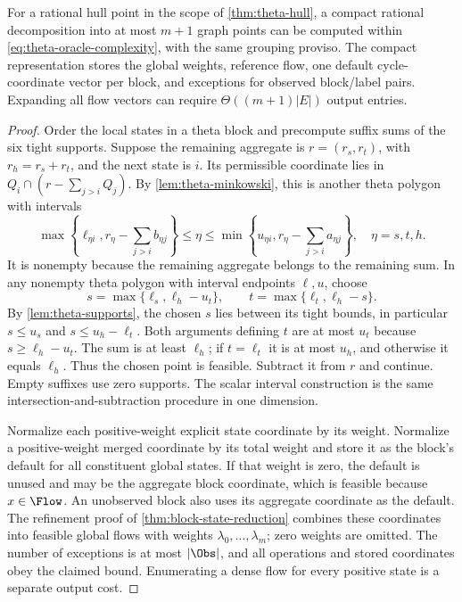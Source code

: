 \begin{proposition}\label{prop:theta-recovery}
For a rational hull point in the scope of \cref{thm:theta-hull}, a compact
rational decomposition into at most $m+1$ graph points can be computed
within \eqref{eq:theta-oracle-complexity}, with the same grouping proviso.
The compact representation stores the global weights, reference flow,
one default cycle-coordinate vector per block, and exceptions for observed block/label
pairs. Expanding all flow vectors can require $\Theta((m+1)|E|)$ output
entries.
\end{proposition}
\begin{proof}
Order the local states in a theta block and precompute suffix sums of
the six tight supports. Suppose the remaining aggregate is $r=(r_s,r_t)$,
with $r_h=r_s+r_t$, and the next state is $i$. Its permissible coordinate
lies in $Q_i\cap(r-\sum_{j>i}Q_j)$. By
\cref{lem:theta-minkowski}, this is another theta polygon with intervals
\begin{equation}\label{eq:theta-recovery-intersection}
 \max\left\{\ell_{\eta i},r_\eta-\sum_{j>i}b_{\eta j}\right\}
 \le\eta\le
 \min\left\{u_{\eta i},r_\eta-\sum_{j>i}a_{\eta j}\right\},
 \quad\eta=s,t,h.
\end{equation}
It is nonempty because the remaining aggregate belongs to the remaining
sum. In any nonempty theta polygon with interval endpoints $\ell,u$,
choose
\begin{equation}\label{eq:theta-point-choice}
 s=\max\{\ell_s,\ell_h-u_t\},\qquad
 t=\max\{\ell_t,\ell_h-s\}.
\end{equation}
By \cref{lem:theta-supports}, the chosen $s$ lies between its tight
bounds, in particular $s\le u_s$ and $s\le u_h-\ell_t$. Both
arguments defining $t$ are at most $u_t$ because
$s\ge\ell_h-u_t$. The sum is at least $\ell_h$; if $t=\ell_t$ it
is at most $u_h$, and otherwise it equals $\ell_h$. Thus the chosen
point is feasible. Subtract it from $r$ and continue. Empty suffixes
use zero supports. The scalar interval construction is the same
intersection-and-subtraction procedure in one dimension.

Normalize each positive-weight explicit state coordinate by its weight.
Normalize a positive-weight merged coordinate by its total weight and
store it as the block's default for all constituent global states.
If that weight is zero, the default is unused and may be the aggregate
block coordinate, which is feasible because $x\in\Flow$. An unobserved
block also uses its aggregate coordinate as the default. The refinement
proof of \cref{thm:block-state-reduction} combines these coordinates into
feasible global flows with weights $\lambda_0,\ldots,\lambda_m$; zero
weights are omitted. The number of exceptions is at most $|\Obs|$,
and all operations and stored coordinates obey the claimed bound.
Enumerating a dense flow for every positive state is a separate output cost.
\end{proof}


